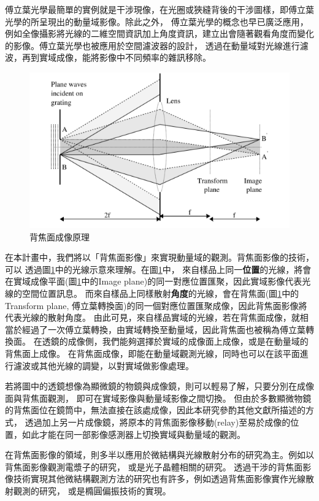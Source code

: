 \documentclass[12pt]{article}
\begin{document}
傅立葉光學最簡單的實例就是干涉現像，在光圈或狹縫背後的干涉圖樣，即傅立葉光學的所呈現出的動量域影像。除此之外，
傅立葉光學的概念也早已廣泛應用，例如全像攝影將光線的二維空間資訊加上角度資訊，建立出會隨著觀看角度而變化的影像。傅立葉光學也被應用於空間濾波器的設計，
透過在動量域對光線進行濾波，再到實域成像，能將影像中不同頻率的雜訊移除。
\begin{figure}[h]
    \centering
    \includegraphics[width=\linewidth]{bfp.png}
    \caption{背焦面成像原理\cite{lightfantastic}}
    \label{bfpimage}
\end{figure}

在本計畫中，我們將以「背焦面影像」來實現動量域的觀測。背焦面影像的技術，可以
透過圖\ref{bfpimage}中的光線示意來理解。在圖\ref{bfpimage}中，
來自樣品上同一\textbf{位置}的光線，將會在實域成像平面(圖\ref{bfpimage}中的Image plane)的同一對應位置匯聚，因此實域影像代表光線的空間位置訊息。
而來自樣品上同樣散射\textbf{角度}的光線，會在背焦面(圖\ref{bfpimage}中的Transform plane, 傅立葉轉換面)的同一個對應位置匯聚成像，因此背焦面影像將代表光線的散射角度。
由此可見，來自樣品實域的光線，若在背焦面成像，就相當於經過了一次傅立葉轉換，由實域轉換至動量域，因此背焦面也被稱為傅立葉轉換面。
在透鏡的成像側，我們能夠選擇於實域的成像面上成像，或是在動量域的背焦面上成像。
在背焦面成像，即能在動量域觀測光線，同時也可以在該平面進行濾波或其他光線的調變，以對實域做影像處理。

若將圖中的透鏡想像為顯微鏡的物鏡與成像鏡，則可以輕易了解，只要分別在成像面與背焦面觀測，
即可在實域影像與動量域影像之間切換。
但由於多數顯微物鏡的背焦面位在鏡筒中，無法直接在該處成像，因此本研究參酌其他文獻\cite{bfpimage}所描述的方式，
透過加上另一片成像鏡，將原本的背焦面影像移動(relay)至易於成像的位置，如此才能在同一部影像感測器上切換實域與動量域的觀測。

在背焦面影像的領域，則多半以應用於微結構與光線散射分布的研究為主。例如以背焦面影像觀測電漿子的研究，
或是光子晶體相關的研究\cite{hartmann2013radiation,zhang2014back,wagner2012back}。
透過干涉的背焦面影像技術實現其他微結構觀測方法的研究也有許多，例如透過背焦面影像實作光線散射觀測的研究\cite{davidson2006interferometric}，
或是橢圓偏振技術的實現\cite{feke1998interferometric}。
\end{document}
